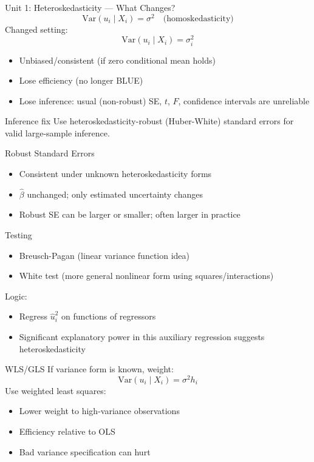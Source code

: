 \documentclass[aspectratio=169]{beamer}
\begin{document}
\begin{frame}{Unit 1: Heteroskedasticity --- What Changes?}
\[
\mathrm{Var}(u_i\mid X_i)=\sigma^2 \quad \text{(homoskedasticity)}
\]
Changed setting:
\[
\mathrm{Var}(u_i\mid X_i)=\sigma_i^2
\]
\begin{itemize}
	\item Unbiased/consistent (if zero conditional mean holds)
	\item Lose efficiency (no longer BLUE)
	\item Lose inference: usual (non-robust) SE, $t$, $F$, confidence intervals are unreliable
\end{itemize}
\begin{block}{Inference fix}
Use heteroskedasticity-robust (Huber-White) standard errors for valid large-sample inference.
\end{block}

\end{frame}

\begin{frame}{Robust Standard Errors}
\begin{itemize}
	\item Consistent under unknown heteroskedasticity forms
	\item $\hat \beta$ unchanged; only estimated uncertainty changes
	\item Robust SE can be larger or smaller; often larger in practice
\end{itemize}
\end{frame}

\begin{frame}{Testing}
\begin{itemize}
	\item Breusch-Pagan (linear variance function idea)
	\item White test (more general nonlinear form using squares/interactions)
\end{itemize}
Logic:
\begin{itemize}
	\item Regress $\hat u_i^2$ on functions of regressors
	\item Significant explanatory power in this auxiliary regression suggests heteroskedasticity
\end{itemize}
\end{frame}

\begin{frame}{WLS/GLS}
If variance form is known, weight:
\[
\mathrm{Var}(u_i\mid X_i)=\sigma^2 h_i
\]
Use weighted least squares:
\begin{itemize}
	\item Lower weight to high-variance observations
	\item Efficiency relative to OLS
	\item Bad variance specification can hurt
\end{itemize}
\end{frame}
\end{document}
